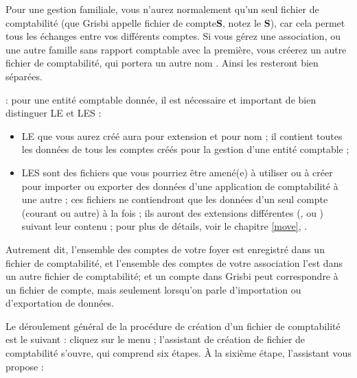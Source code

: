 Pour une gestion familiale, vous n'aurez normalement qu'un seul fichier de comptabilité (que Grisbi appelle fichier de compte\textbf{S}, notez le \textbf{S}), car cela permet tous les échanges entre vos différents comptes. Si vous gérez une association, ou une autre famille sans rapport comptable avec la première, vous créerez un autre fichier de comptabilité, qui portera un autre nom . Ainsi les  resteront bien séparées.

\textcolor{red}{} : pour une entité comptable donnée, il est nécessaire et important de bien distinguer LE  et LES  :

\begin{itemize}
	\item LE  que vous aurez créé aura pour extension  et pour nom  ; il contient toutes les données de tous les comptes créés pour la gestion d'une entité comptable ;
	\item LES  sont des fichiers que vous pourriez être amené(e) à utiliser ou à créer pour importer ou exporter des données d'une application de comptabilité à une autre ; ces fichiers ne contiendront que les données d'un seul compte (courant ou autre) à la fois ; ils auront des extensions différentes (,  ou ) suivant leur contenu ; pour plus de détails, voir le chapitre \vref{move}, .
\end{itemize}

Autrement dit, l'ensemble des comptes de votre foyer est enregistré dans un fichier de comptabilité, et l'ensemble des comptes de votre association l'est dans un autre fichier de comptabilité; et un compte dans Grisbi peut correspondre à un fichier de compte, mais seulement lorsqu'on parle d'importation ou d'exportation de données.

Le déroulement général de la procédure de création d'un fichier de comptabilité est le suivant : cliquez sur le menu  ; l'assistant de création de fichier de comptabilité s'ouvre, qui comprend six étapes. À la sixième étape, l'assistant vous propose :

